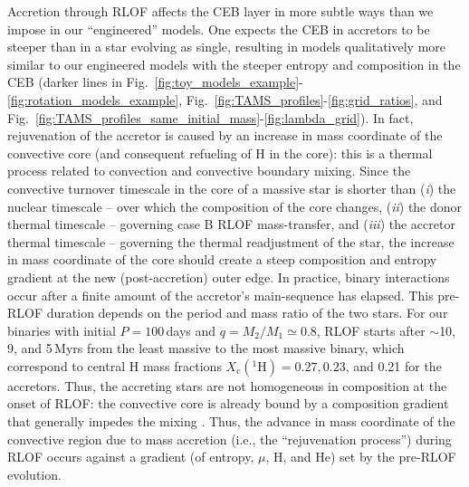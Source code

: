 \documentclass[twocolumn,twocolappendix,trackchanges]{aastex63}
\DeclareRobustCommand{\Figref}[1]{Fig.~\ref{#1}}
\begin{document}
Accretion through RLOF affects the CEB layer in more subtle ways than
we impose in our ``engineered'' models. One expects the CEB in
accretors to be steeper than in a star evolving as single, resulting
in models qualitatively more similar to our engineered models with the
steeper entropy and composition in the CEB (darker lines in
\Figref{fig:toy_models_example}-\ref{fig:rotation_models_example},
\Figref{fig:TAMS_profiles}-\ref{fig:grid_ratios}, and
\Figref{fig:TAMS_profiles_same_initial_mass}-\ref{fig:lambda_grid}).
In fact, rejuvenation of the accretor is caused by an increase in mass
coordinate of the convective core (and consequent refueling of H in
the core): this is a thermal process related to convection and
convective boundary mixing. Since the convective turnover timescale in
the core of a massive star is shorter than (\emph{i}) the nuclear
timescale -- over which the composition of the core changes,
(\emph{ii}) the donor thermal timescale -- governing case B RLOF
mass-transfer, and (\emph{iii}) the accretor thermal timescale --
governing the thermal readjustment of the star, the increase in mass
coordinate of the core should create a steep composition and entropy
gradient at the new (post-accretion) outer edge. In practice, binary
interactions occur after a finite amount of the accretor's
main-sequence has elapsed. This pre-RLOF duration depends on the
period and mass ratio of the two stars. For our binaries with initial
$P=100$\,days and $q=M_2/M_1\simeq 0.8$, RLOF starts after $\sim{}$10,
9, and 5\,Myrs from the least massive to the most massive binary,
which correspond to central H mass fractions
$X_\mathrm{c}(^1\mathrm{H}) = 0.27, 0.23$, and 0.21 for the accretors.
Thus, the accreting stars are not homogeneous in composition at the
onset of RLOF: the convective core is already bound by a composition
gradient that generally impedes the mixing \citep[e.g.,][]{yoon:05}.
Thus, the advance in mass coordinate of the convective region due to
mass accretion (i.e., the ``rejuvenation process'') during RLOF occurs
against a gradient (of entropy, $\mu$, H, and He) set by the pre-RLOF
evolution.
\end{document}
